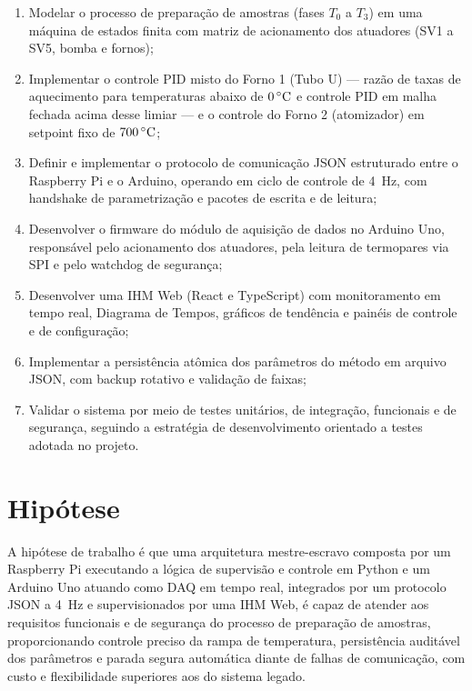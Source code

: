 \begin{enumerate}[label=\arabic*)]
  \item Modelar o processo de preparação de amostras (fases $T_0$ a $T_3$) em
  uma máquina de estados finita com matriz de acionamento dos atuadores (SV1 a
  SV5, bomba e fornos);
  \item Implementar o controle PID misto do Forno 1 (Tubo U) --- razão de taxas
  de aquecimento para temperaturas abaixo de $0\,\celsius$ e controle PID em
  malha fechada acima desse limiar --- e o controle do Forno 2 (atomizador) em
  setpoint fixo de $700\,\celsius$;
  \item Definir e implementar o protocolo de comunicação JSON estruturado entre
  o Raspberry Pi e o Arduino, operando em ciclo de controle de 4~Hz, com
  handshake de parametrização e pacotes de escrita e de leitura;
  \item Desenvolver o firmware do módulo de aquisição de dados no Arduino Uno,
  responsável pelo acionamento dos atuadores, pela leitura de termopares via
  SPI e pelo watchdog de segurança;
  \item Desenvolver uma IHM Web (React e TypeScript) com monitoramento em tempo
  real, Diagrama de Tempos, gráficos de tendência e painéis de controle e de
  configuração;
  \item Implementar a persistência atômica dos parâmetros do método em arquivo
  JSON, com backup rotativo e validação de faixas;
  \item Validar o sistema por meio de testes unitários, de integração,
  funcionais e de segurança, seguindo a estratégia de desenvolvimento orientado
  a testes adotada no projeto.
\end{enumerate}

\section{Hipótese}

A hipótese de trabalho é que uma arquitetura mestre-escravo composta por um
Raspberry Pi executando a lógica de supervisão e controle em Python e um Arduino
Uno atuando como DAQ em tempo real, integrados por um protocolo JSON a 4~Hz e
supervisionados por uma IHM Web, é capaz de atender aos requisitos funcionais e
de segurança do processo de preparação de amostras, proporcionando controle
preciso da rampa de temperatura, persistência auditável dos parâmetros e parada
segura automática diante de falhas de comunicação, com custo e flexibilidade
superiores aos do sistema legado.

